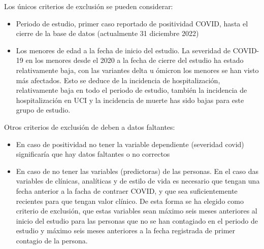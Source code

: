 \documentclass[
]{article}
\begin{document}
Los únicos criterios de exclusión se pueden considerar:

\begin{itemize}
\item
  Periodo de estudio, primer caso reportado de positividad COVID, hasta
  el cierre de la base de datos (actualmente 31 diciembre 2022)
\item
  Los menores de edad a la fecha de inicio del estudio. La severidad de
  COVID-19 en los menores desde el 2020 a la fecha de cierre del estudio
  ha estado relativamente baja, con las variantes delta u ómicron los
  menores se han visto más afectados. Esto se deduce de la incidencia de
  hospitalización, relativamente baja en todo el periodo de estudio,
  también la incidencia de hospitalización en UCI y la incidencia de
  muerte has sido bajas para este grupo de estudio.
\end{itemize}

Otros criterios de exclusión de deben a datos faltantes:

\begin{itemize}
\item
  En caso de positividad no tener la variable dependiente (severidad
  covid) significaría que hay datos faltantes o no correctos
\item
  En caso de no tener las variables (predictoras) de las personas. En el
  caso das variables de clínicas, analíticas y de estilo de vida es
  necesario que tengan una fecha anterior a la facha de contraer COVID,
  y que sea suficientemente recientes para que tengan valor clínico. De
  esta forma se ha elegido como criterio de exclusión, que estas
  variables sean máximo seis meses anteriores al inicio del estudio para
  las personas que no se han contagiado en el periodo de estudio y
  máximo seis meses anteriores a la fecha registrada de primer contagio
  de la persona.
\end{itemize}

\pagebreak
\end{document}
